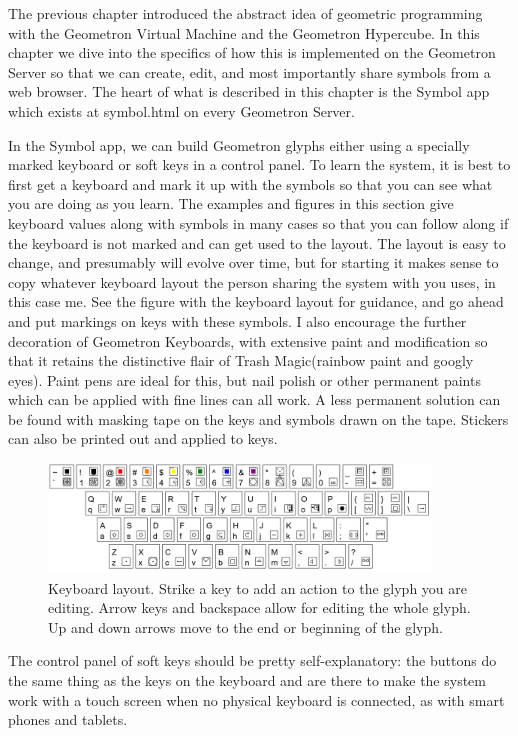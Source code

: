 
The previous chapter introduced the abstract idea of geometric programming with the Geometron Virtual Machine and the Geometron Hypercube.  In this chapter we dive into the specifics of how this is implemented on the Geometron Server so that we can create, edit, and most importantly share symbols from a web browser.  The heart of what is described in this chapter is the Symbol app which exists at symbol.html on every Geometron Server.

In the Symbol app, we can build Geometron glyphs either using a specially marked keyboard or soft keys in a control panel.  To learn the system, it is best to first get a keyboard and mark it up with the symbols so that you can see what you are doing as you learn.  The examples and figures in this section give keyboard values along with symbols in many cases so that you can follow along if the keyboard is not marked and can get used to the layout.  The layout is easy to change, and presumably will evolve over time, but for starting it makes sense to copy whatever keyboard layout the person sharing the system with you uses, in this case me.  See the figure with the keyboard layout for guidance, and go ahead and put markings on keys with these symbols.  I also encourage the further decoration of Geometron Keyboards, with extensive paint and modification so that it retains the distinctive flair of Trash Magic(rainbow paint and googly eyes).   Paint pens are ideal for this, but nail polish or other permanent paints which can be applied with fine lines can all work. A less permanent solution can be found with masking tape on the keys and symbols drawn on the tape.  Stickers can also be printed out and applied to keys.
     
\begin{figure}
	\centering
	\includegraphics[width=4in]{figures/web2d/keyboard.png}
	\caption[keyboard]
	{Keyboard layout.  Strike a key to add an action to the glyph you are editing.  Arrow keys and backspace allow for editing the whole glyph.  Up and down arrows move to the end or beginning of the glyph.}
\end{figure}

The control panel of soft keys should be pretty self-explanatory: the buttons do the same thing as the keys on the keyboard and are there to make the system work with a touch screen when no physical keyboard is connected, as with smart phones and tablets.

